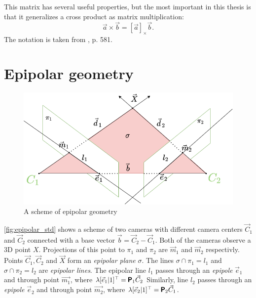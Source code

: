 This matrix has several useful properties, but the most important in this thesis is that it generalizes a cross product as matrix multiplication:
\begin{equation}
    \vec{a} \times \vec{b} = [\vec{a}]_{\times} \vec{b}.
\end{equation}
The notation is taken from \cite{hartley_zisserman_2004}, p. 581.

\section{Epipolar geometry}
\label{sec:epipolar_geometry}
\begin{figure}[ht]
    \centering
    \includegraphics[width=\textwidth]{graphics/epipolar.png}
    \caption{A scheme of epipolar geometry}
    \label{fig:epipolar_std}
\end{figure}

\autoref{fig:epipolar_std} shows a scheme of two cameras with different camera centers $\vec{C}_1$ and $\vec{C}_2$ connected with a base vector $\vec{b} = \vec{C}_2 - \vec{C}_1$. 
Both of the cameras observe a 3D point $X$. 
Projections of this point to $\pi_1$ and $\pi_2$ are $\vec{m}_1$ and $\vec{m}_2$ respectivly. 
Points $\vec{C}_1, \vec{C}_2$ and $\vec{X}$ form an \textit{epipolar plane} $\sigma$.
The lines $\sigma \cap \pi_1 = l_1$ and $\sigma \cap \pi_2 = l_2$ are \textit{epipolar lines}. 
The epipolar line $l_1$ passes through an \textit{epipole} $\vec{e}_1$ and through point $\vec{m_1}$, where $\lambda [\vec{e}_1 | 1]^\top = \pmb{\mathsf{P}}_1 \vec{C}_2$
Similarly, line $l_2$ passes through an \textit{epipole} $\vec{e}_2$ and through point $\vec{m_2}$, where $\lambda [\vec{e}_2 | 1]^\top = \pmb{\mathsf{P}}_2 \vec{C}_1$.

